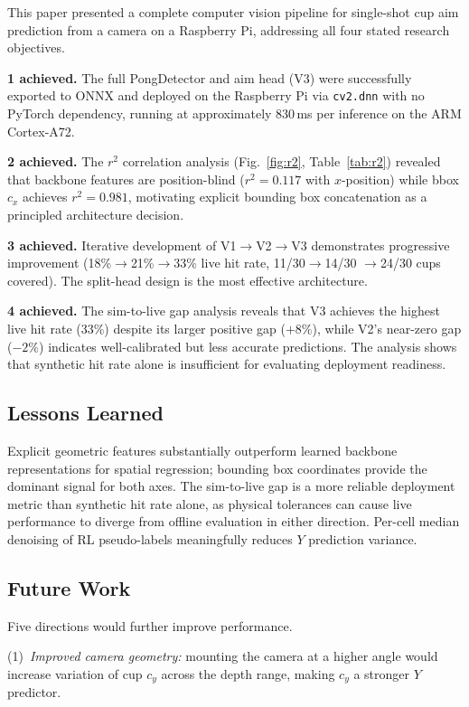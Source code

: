 \documentclass[conference]{IEEEtran}
\begin{document}
This paper presented a complete computer vision pipeline for single-shot cup
aim prediction from a camera on a Raspberry Pi, addressing all four stated
research objectives.

\textbf{1 achieved.}  The full PongDetector and aim head (V3) were
successfully exported to ONNX and deployed on the Raspberry Pi via
\texttt{cv2.dnn} with no PyTorch dependency, running at approximately
830\,ms per inference on the ARM Cortex-A72.

\textbf{2 achieved.}  The $r^{2}$ correlation analysis (Fig.~\ref{fig:r2},
Table~\ref{tab:r2}) revealed that backbone features are position-blind
($r^{2}=0.117$ with $x$-position) while bbox $c_x$ achieves $r^{2}=0.981$,
motivating explicit bounding box concatenation as a principled architecture
decision.

\textbf{3 achieved.}  Iterative development of V1$\to$V2$\to$V3 demonstrates
progressive improvement (18\%$\to$21\%$\to$33\% live hit rate, 11/30$\to$14/30
$\to$24/30 cups covered).  The split-head design is the most effective
architecture.

\textbf{4 achieved.}  The sim-to-live gap analysis reveals that V3 achieves
the highest live hit rate (33\%) despite its larger positive gap ($+8\%$),
while V2's near-zero gap ($-2\%$) indicates well-calibrated but less accurate
predictions.  The analysis shows that synthetic hit rate alone is insufficient
for evaluating deployment readiness.

\subsection*{Lessons Learned}

Explicit geometric features substantially outperform learned backbone
representations for spatial regression; bounding box coordinates provide the
dominant signal for both axes.  The sim-to-live gap is a more reliable
deployment metric than synthetic hit rate alone, as physical tolerances can
cause live performance to diverge from offline evaluation in either direction.
Per-cell median denoising of RL pseudo-labels meaningfully reduces $Y$
prediction variance.

\subsection*{Future Work}

Five directions would further improve performance.

(1)~\textit{Improved camera geometry:} mounting the camera at a higher angle
would increase variation of cup $c_y$ across the depth range, making $c_y$ a
stronger $Y$ predictor.
\end{document}
